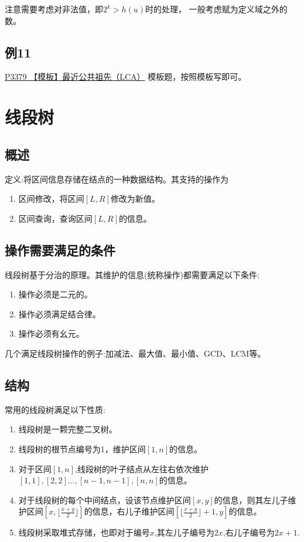 \documentclass{article}
\newcommand{\inputcppfile}[1]{}
\begin{document}
注意需要考虑对非法值，即$2^k > h(u)$时的处理， 一般考虑赋为定义域之外的数。

\subsection{例11}
\href{https://www.luogu.com.cn/problem/P3379}{P3379 【模板】最近公共祖先（LCA）}
模板题，按照模板写即可。
\inputcppfile{Code_11.cpp}

\section{线段树}
\subsection{概述}

定义:将区间信息存储在结点的一种数据结构。其支持的操作为
\begin{enumerate}
    \item 区间修改，将区间$[L,R]$修改为新值。
    \item 区间查询，查询区间$[L,R]$的信息。
\end{enumerate}

\subsection{操作需要满足的条件}
线段树基于分治的原理。其维护的信息(统称操作)都需要满足以下条件:

\begin{enumerate}
    \item 操作必须是二元的。
    \item 操作必须满足结合律。
    \item 操作必须有幺元。
\end{enumerate}

几个满足线段树操作的例子:加减法、最大值、最小值、GCD、LCM等。

\subsection{结构}
常用的线段树满足以下性质:

\begin{enumerate}
    \item 线段树是一颗完整二叉树。
    \item 线段树的根节点编号为1，维护区间$[1,n]$的信息。
    \item 对于区间$[1,n]$,线段树的叶子结点从左往右依次维护$[1,1],[2,2]...,[n-1,n-1],[n,n]$的信息。
    \item 对于线段树的每个中间结点，设该节点维护区间$[x,y]$的信息，则其左儿子维护区间$[x,  \lfloor \frac{x+y}{2}\rfloor]$的信息，右儿子维护区间$[\lfloor \frac{x+y}{2} \rfloor +1,y]$的信息。
    \item 线段树采取堆式存储，也即对于编号$x$,其左儿子编号为$2x$,右儿子编号为$2x+1$.
\end{enumerate}
\end{document}
